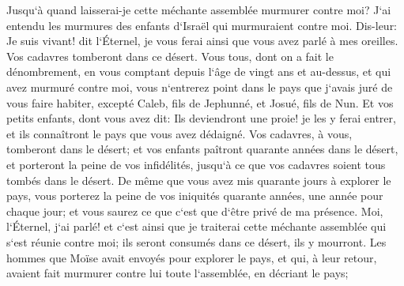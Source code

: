 \verse Jusqu`à quand laisserai-je cette méchante assemblée murmurer contre moi? J`ai entendu les murmures des enfants d`Israël qui murmuraient contre moi. 
\verse Dis-leur: Je suis vivant! dit l`Éternel, je vous ferai ainsi que vous avez parlé à mes oreilles. 
\verse Vos cadavres tomberont dans ce désert. Vous tous, dont on a fait le dénombrement, en vous comptant depuis l`âge de vingt ans et au-dessus, et qui avez murmuré contre moi, 
\verse vous n`entrerez point dans le pays que j`avais juré de vous faire habiter, excepté Caleb, fils de Jephunné, et Josué, fils de Nun. 
\verse Et vos petits enfants, dont vous avez dit: Ils deviendront une proie! je les y ferai entrer, et ils connaîtront le pays que vous avez dédaigné. 
\verse Vos cadavres, à vous, tomberont dans le désert; 
\verse et vos enfants paîtront quarante années dans le désert, et porteront la peine de vos infidélités, jusqu`à ce que vos cadavres soient tous tombés dans le désert. 
\verse De même que vous avez mis quarante jours à explorer le pays, vous porterez la peine de vos iniquités quarante années, une année pour chaque jour; et vous saurez ce que c`est que d`être privé de ma présence. 
\verse Moi, l`Éternel, j`ai parlé! et c`est ainsi que je traiterai cette méchante assemblée qui s`est réunie contre moi; ils seront consumés dans ce désert, ils y mourront. 
\verse Les hommes que Moïse avait envoyés pour explorer le pays, et qui, à leur retour, avaient fait murmurer contre lui toute l`assemblée, en décriant le pays; 
